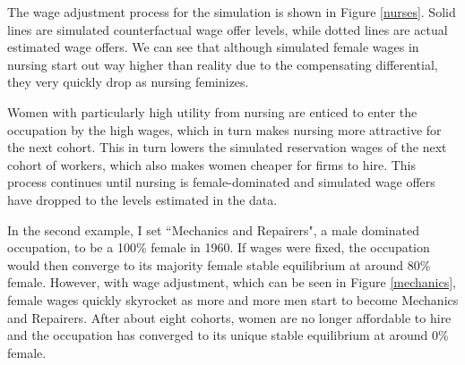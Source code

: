 \documentclass[12pt]{article}
\begin{document}
The wage adjustment process for the simulation is shown in Figure \ref{nurses}. Solid lines are simulated counterfactual wage offer levels, while dotted lines are actual estimated wage offers. We can see that although simulated female wages in nursing start out way higher than reality due to the compensating differential, they very quickly drop as nursing feminizes. %

Women with particularly high utility from nursing are enticed to enter the occupation by the high wages, which in turn makes nursing more attractive for the next cohort. This in turn lowers the simulated reservation wages of the next cohort of workers, which also makes women cheaper for firms to hire. This process continues until nursing is female-dominated and simulated wage offers have dropped to the levels estimated in the data.

In the second example, I set ``Mechanics and Repairers", a male dominated occupation, to be a 100\% female in 1960. If wages were fixed, the occupation would then converge to its majority female stable equilibrium at around 80\% female. However, with wage adjustment, which can be seen in Figure \ref{mechanics}, female wages quickly skyrocket as more and more men start to become Mechanics and Repairers. After about eight cohorts, women are no longer affordable to hire and the occupation has converged to its unique stable equilibrium at around 0\% female.






\end{document}
